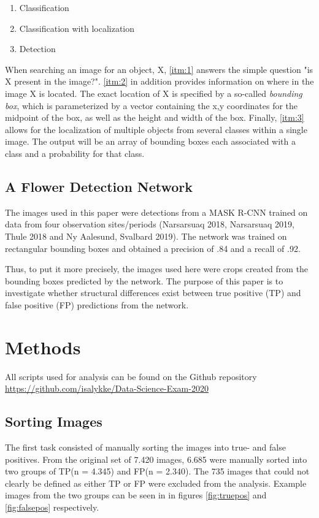 \documentclass[12pt]{article}
\begin{document}
\begin{enumerate}
	\item Classification\label{itm:1}
	\item Classification with localization\label{itm:2}
	\item Detection\label{itm:3}
\end{enumerate}

When searching an image for an object, X, \ref{itm:1} answers the simple question "is X present in the image?". \ref{itm:2} in addition provides information on where in the image X is located. The exact location of X is specified by a so-called \textit{bounding box}, which is parameterized by a vector containing the x,y coordinates for the midpoint of the box, as well as the height and width of the box. Finally, \ref{itm:3} allows for the localization of multiple objects from several classes within a single image. The output will be an array of bounding boxes each associated with a class and a probability for that class.

\subsection{A Flower Detection Network}
The images used in this paper were detections from a MASK R-CNN trained on data from four observation sites/periods (Narsarsuaq 2018, Narsarsuaq 2019, Thule 2018 and Ny Aalesund, Svalbard 2019). The network was trained on rectangular bounding boxes and obtained a precision of .84 and a recall of .92. 

Thus, to put it more precisely, the images used here were crops created from the bounding boxes predicted by the network. The purpose of this paper is to investigate whether structural differences exist between true positive (TP) and false positive (FP) predictions from the network.


\section{Methods}
All scripts used for analysis can be found on the Github repository \url{https://github.com/isalykke/Data-Science-Exam-2020}

\subsection{Sorting Images}
The first task consisted of manually sorting the images into true- and false positives. 
From the original set of 7.420 images, 6.685 were manually sorted into two groups of TP(n = 4.345) and FP(n = 2.340). The 735 images that could not clearly be defined as either TP or FP were excluded from the analysis. Example images from the two groups can be seen in in figures \ref{fig:truepos} and \ref{fig:falsepos} respectively.
\end{document}
